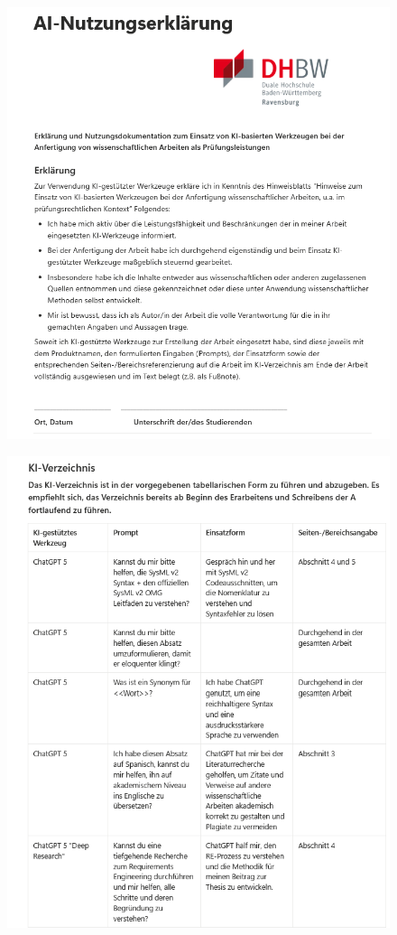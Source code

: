 \begin{figure}[htbp]
  \centering
  \includegraphics[width=\linewidth]{ressources/AI-usage/KI-NE1.png}
\end{figure}
\begin{figure}[htbp]
  \centering
  \includegraphics[width=\linewidth]{ressources/AI-usage/KI-NE2.png}
\end{figure}
